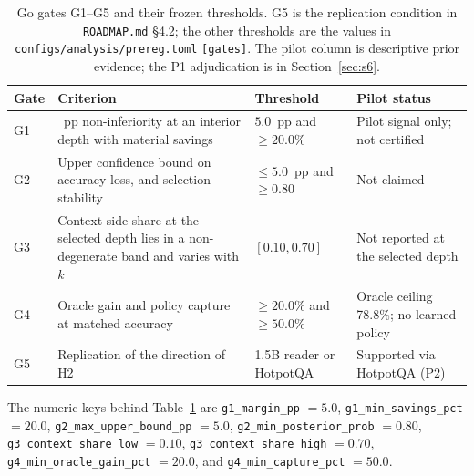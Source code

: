 \begin{table}[pos=htbp]
  \centering
  \caption{Go gates G1--G5 and their frozen thresholds. G5 is the replication condition in
  \texttt{ROADMAP.md} \S4.2; the other thresholds are the values in
  \texttt{configs/analysis/prereg.toml} \texttt{[gates]}. The pilot column is descriptive prior
  evidence; the P1 adjudication is in Section~\ref{sec:s6}.}
  \label{tab:ggates}
  \small
  \begin{tabularx}{\textwidth}{>{\raggedright\arraybackslash}p{0.9cm}>{\raggedright\arraybackslash}p{6.3cm}>{\raggedright\arraybackslash}p{3.0cm}>{\raggedright\arraybackslash}X}
    \toprule
    \textbf{Gate} & \textbf{Criterion} & \textbf{Threshold} & \textbf{Pilot status} \\
    \midrule
    G1 & 5~pp non-inferiority at an interior depth with material savings & $5.0$~pp and $\ge20.0\%$ & Pilot signal only; not certified \\
    G2 & Upper confidence bound on accuracy loss, and selection stability & $\le5.0$~pp and $\ge0.80$ & Not claimed \\
    G3 & Context-side share at the selected depth lies in a non-degenerate band and varies with $k$ & $[0.10,0.70]$ & Not reported at the selected depth \\
    G4 & Oracle gain and policy capture at matched accuracy & $\ge20.0\%$ and $\ge50.0\%$ & Oracle ceiling 78.8\%; no learned policy \\
    G5 & Replication of the direction of H2 & 1.5B reader or HotpotQA & Supported via HotpotQA (P2) \\
    \bottomrule
  \end{tabularx}
\end{table}

The numeric keys behind Table~\ref{tab:ggates} are
\texttt{g1\_margin\_pp} $=5.0$, \texttt{g1\_min\_savings\_pct} $=20.0$,
\texttt{g2\_max\_upper\_bound\_pp} $=5.0$, \texttt{g2\_min\_posterior\_prob} $=0.80$,
\texttt{g3\_context\_share\_low} $=0.10$, \texttt{g3\_context\_share\_high} $=0.70$,
\texttt{g4\_min\_oracle\_gain\_pct} $=20.0$, and
\texttt{g4\_min\_capture\_pct} $=50.0$.

